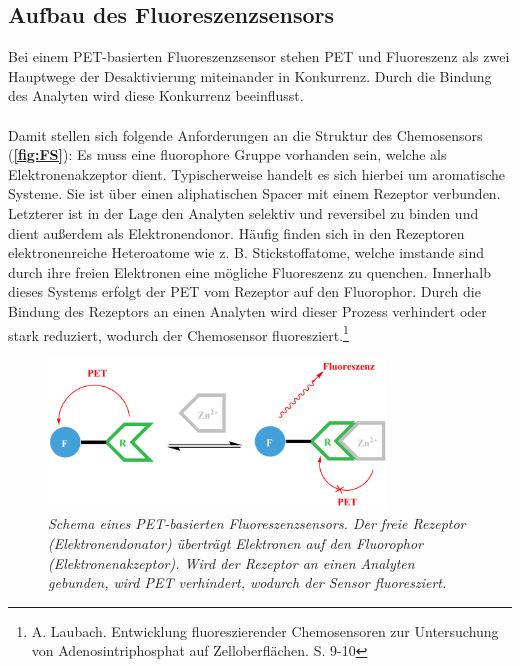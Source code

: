 \documentclass[12pt,a4paper]{report}
\begin{document}
	\subsection{Aufbau des Fluoreszenzsensors}
	Bei einem PET-basierten Fluoreszenzsensor stehen PET und Fluoreszenz als zwei Hauptwege der Desaktivierung miteinander in Konkurrenz. Durch die Bindung des Analyten wird diese Konkurrenz beeinflusst.\\
	\ \\
	Damit stellen sich folgende Anforderungen an die Struktur des  Chemosensors (\textbf{\autoref{fig:FS}}): Es muss eine \textnormal{fluorophore Gruppe} vorhanden sein, welche als Elektronenakzeptor dient. Typischerweise handelt es sich hierbei um aromatische Systeme. Sie ist über einen aliphatischen \textnormal{Spacer} mit einem \textnormal{Rezeptor} verbunden. Letzterer ist in der Lage den Analyten selektiv und reversibel zu binden und dient außerdem als Elektronendonor. Häufig finden sich in den Rezeptoren elektronenreiche Heteroatome wie z. B. Stickstoffatome, welche imstande sind durch ihre freien Elektronen eine mögliche Fluoreszenz zu quenchen. Innerhalb dieses Systems erfolgt der PET vom Rezeptor auf den Fluorophor. Durch die Bindung des Rezeptors an einen Analyten wird dieser Prozess verhindert oder stark reduziert, wodurch der Chemosensor fluoresziert.\footnote{A. Laubach. Entwicklung fluoreszierender Chemosensoren zur
	Untersuchung von Adenosintriphosphat auf
	Zelloberflächen. S. 9-10}
	\begin{figure}[h!]
		\centering
		\includegraphics[width=0.8\textwidth]{Sensor.png}
		\caption{\textnormal{\textit{Schema eines PET-basierten Fluoreszenzsensors. Der freie Rezeptor (Elektronendonator) überträgt Elektronen auf den Fluorophor (Elektronenakzeptor). Wird
		der Rezeptor an einen Analyten gebunden, wird PET verhindert, wodurch der Sensor fluoresziert.}}} 
		\label{fig:FS}
	\end{figure}
\end{document}
